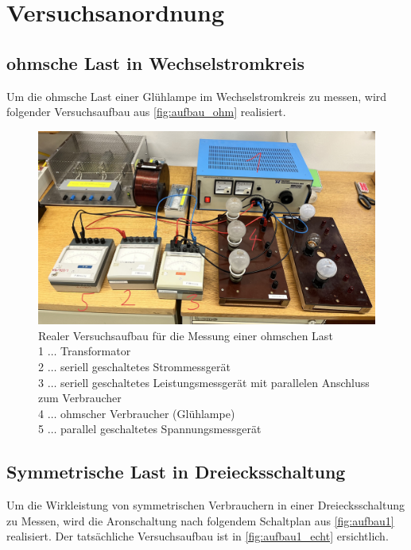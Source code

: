 \documentclass[12pt,english,ngerman]{scrartcl}
\begin{document}
\section{Versuchsanordnung}\label{sec:versuchsanordnung}

\subsection{ohmsche Last in Wechselstromkreis}

Um die ohmsche Last einer Glühlampe im Wechselstromkreis zu messen, wird
folgender Versuchsaufbau aus \autoref{fig:aufbau_ohm} realisiert.

\begin{figure}[H]
	\centering
	\includegraphics[width = 0.5\linewidth]{./figures/aufbau_ohm.png}
	\caption[Realer Versuchsaufbau für die Messung einer ohmschen Last]{Realer
		Versuchsaufbau für die Messung einer ohmschen Last \\
		1 \(\dots\) Transformator                          \\
		2 \(\dots\) seriell geschaltetes Strommessgerät    \\
		3 \(\dots\) seriell geschaltetes Leistungsmessgerät mit parallelen Anschluss
		zum Verbraucher                                    \\
		4 \(\dots\) ohmscher Verbraucher (Glühlampe)       \\
		5 \(\dots\) parallel geschaltetes Spannungsmessgerät
	}\label{fig:aufbau_ohm}
\end{figure}

\subsection{Symmetrische Last in Dreiecksschaltung}

Um die Wirkleistung von symmetrischen Verbrauchern in einer Dreiecksschaltung
zu Messen, wird die Aronschaltung nach folgendem Schaltplan aus
\autoref{fig:aufbau1} realisiert. Der tatsächliche Versuchsaufbau ist in
\autoref{fig:aufbau1_echt} ersichtlich.
\end{document}
